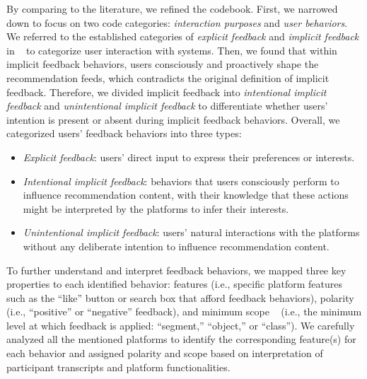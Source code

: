 By comparing to the literature, we refined the codebook. First, we narrowed down to focus on two code categories: \textit{interaction purposes} and \textit{user behaviors}. We referred to the established categories of \textit{explicit feedback} and \textit{implicit feedback} in ~\cite{jannach2018recommending} to categorize user interaction with systems. Then, we found that within implicit feedback behaviors, users consciously and proactively shape the recommendation feeds, which contradicts the original definition of implicit feedback. Therefore, we divided implicit feedback into \textit{intentional implicit feedback} and \textit{unintentional implicit feedback} to differentiate whether users' intention is present or absent during implicit feedback behaviors. Overall, we categorized users' feedback behaviors into three types:
\begin{itemize}
    \item \textit{Explicit feedback}: users' direct input to express their preferences or interests.
    
    \item \textit{Intentional implicit feedback}: behaviors that users consciously perform to influence recommendation content, with their knowledge that these actions might be interpreted by the platforms to infer their interests.
    
    \item \textit{Unintentional implicit feedback}: users' natural interactions with the platforms without any deliberate intention to influence recommendation content.
\end{itemize}


To further understand and interpret feedback behaviors, we mapped three key properties to each identified behavior: features (i.e., specific platform features such as the ``like'' button or search box that afford feedback behaviors), polarity ~\cite{jawaheer2014modeling,hu2008collaborative} (i.e., ``positive'' or ``negative'' feedback), and minimum scope ~\cite{oard2001modeling} (i.e., the minimum level at which feedback is applied: ``segment,'' ``object,'' or ``class''). We carefully analyzed all the mentioned platforms to identify the corresponding feature(s) for each behavior and assigned polarity and scope based on interpretation of participant transcripts and platform functionalities.

